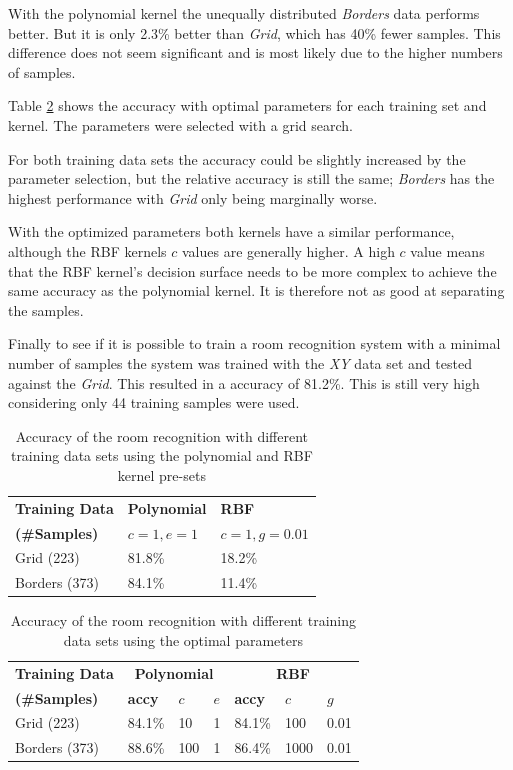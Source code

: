 With the polynomial kernel the unequally distributed \emph{Borders} data performs better. But it is only 2.3\% better than \emph{Grid}, which has 40\% fewer samples. This difference does not seem significant and is most likely due to the higher numbers of samples.

Table \ref{tab:SVMconfigurationPoly} shows the accuracy with optimal parameters for each training set and kernel. The parameters were selected with a grid search.

For both training data sets the accuracy could be slightly increased by the parameter selection, but the relative accuracy is still the same; \emph{Borders} has the highest performance with \emph{Grid} only being marginally worse.

With the optimized parameters both kernels have a similar performance, although the RBF kernels $c$ values are generally higher. A high $c$ value means that the RBF kernel's decision surface needs to be more complex to achieve the same accuracy as the polynomial kernel. It is therefore not as good at separating the samples. 

Finally to see if it is possible to train a room recognition system with a minimal number of samples the system was trained with the \emph{XY} data set and tested against the \emph{Grid}. This resulted in a accuracy of 81.2\%. This is still very high considering only 44 training samples were used.



\begin{table}

\centering
\begin{tabular}{l l l}
\toprule
\textbf{Training Data}&\textbf{Polynomial}&\textbf{RBF}\\
\textbf{(\#Samples)}&$c=1,e=1$&$c=1,g=0.01$\\
\midrule
Grid (223)&81.8\%&18.2\%\\
Borders (373)&84.1\%&11.4\%\\
\bottomrule
\end{tabular}
\caption[Room recognition - SVM pre-sets]{Accuracy of the room recognition with different training data sets using the polynomial and RBF kernel pre-sets}
\label{tab:SVMconfigurationPresets}
\end{table}

\begin{table}
\centering
\begin{tabular}{l l l l l l l}
\toprule
\textbf{Training Data}&\multicolumn{3}{c}{\textbf{Polynomial}}&\multicolumn{3}{c}{\textbf{RBF}}\\
\textbf{(\#Samples)}&\textbf{accy}&$c$&$e$&\textbf{accy}&$c$&$g$\\
\midrule
Grid (223)&84.1\%&10&1&84.1\%&100&0.01\\
Borders (373)&88.6\%&100&1&86.4\%&1000&0.01\\
\bottomrule
\end{tabular}
\caption[Room Recognition - optimized parameters]{Accuracy of the room recognition with different training data sets using the optimal parameters}
\label{tab:SVMconfigurationPoly}
\end{table}

